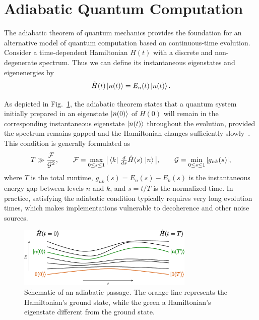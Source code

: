 \section{Adiabatic Quantum Computation}
\label{Section:AQC}
The adiabatic theorem of quantum mechanics provides the foundation for an alternative model of quantum computation based on continuous-time evolution. Consider a time-dependent Hamiltonian $H(t)$ with a discrete and non-degenerate spectrum. Thus we can define its instantaneous eigenstates and eigenenergies by
\begin{equation}
    \hat{H}(t) \ket{n(t)} = E_n (t) \ket{n(t)}.
    \label{eq:instantaneous_eigenstates}
\end{equation}

\noindent As depicted in Fig.~\ref{fig:adiabatic_passage}, the adiabatic theorem states that a quantum system initially prepared in an eigenstate $\ket{n(0)}$ of $H(0)$ will remain in the corresponding instantaneous eigenstate $\ket{n(t)}$ throughout the evolution, provided the spectrum remains gapped and the Hamiltonian changes sufficiently slowly~\cite{sarandy_consistency_2004}. This condition is generally formulated as
\begin{equation}
    T \gg \frac{\mathcal{F}}{\mathcal{G}^2}, 
    \qquad 
    \mathcal{F} = \max_{0 \leq s \leq 1} \big| \bra{k}\,\tfrac{d}{ds}\hat{H}(s)\,\ket{n} \big|, 
    \qquad
    \mathcal{G} = \min_{0 \leq s \leq 1} |g_{nk}(s)| ,
    \label{eq:adiabatic_condition}
\end{equation}
where $T$ is the total runtime, $g_{nk}(s) = E_n(s) - E_k(s)$ is the instantaneous energy gap between levels $n$ and $k$, and $s=t/T$ is the normalized time. In practice, satisfying the adiabatic condition typically requires very long evolution times, which makes implementations vulnerable to decoherence and other noise sources.


\begin{figure}[h]
    \centering
    \includegraphics[width=0.75\textwidth]{01-introduction/figs/adiabatic_theorem.pdf}
    \caption{Schematic of an adiabatic passage. The orange line represents the Hamiltonian's ground state, while the green a Hamiltonian's eigenstate different from the ground state.}
    \label{fig:adiabatic_passage}
\end{figure}

